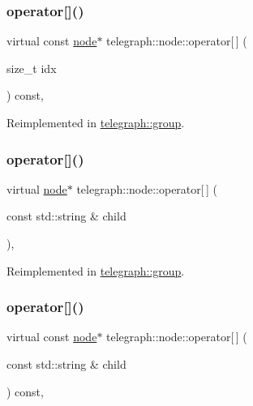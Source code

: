 \subsubsection{\texorpdfstring{operator[]()}{operator[]()}\hspace{0.1cm}{\footnotesize\ttfamily [2/4]}}
{\footnotesize\ttfamily virtual const \hyperlink{classtelegraph_1_1node}{node}$\ast$ telegraph\+::node\+::operator\mbox{[}$\,$\mbox{]} (\begin{DoxyParamCaption}\item[{size\+\_\+t}]{idx }\end{DoxyParamCaption}) const\hspace{0.3cm}{\ttfamily [inline]}, {\ttfamily [virtual]}}



Reimplemented in \hyperlink{classtelegraph_1_1group_a1b084997076f624d3814b057b26162cd}{telegraph\+::group}.

\mbox{\label{classtelegraph_1_1node_a3cf657c57fe639f6288f2acdd9b50e3c}} 
\subsubsection{\texorpdfstring{operator[]()}{operator[]()}\hspace{0.1cm}{\footnotesize\ttfamily [3/4]}}
{\footnotesize\ttfamily virtual \hyperlink{classtelegraph_1_1node}{node}$\ast$ telegraph\+::node\+::operator\mbox{[}$\,$\mbox{]} (\begin{DoxyParamCaption}\item[{const std\+::string \&}]{child }\end{DoxyParamCaption})\hspace{0.3cm}{\ttfamily [inline]}, {\ttfamily [virtual]}}



Reimplemented in \hyperlink{classtelegraph_1_1group_a84db0dc9c8d45bdd343a0d4da44a3593}{telegraph\+::group}.

\mbox{\label{classtelegraph_1_1node_aad6b0bbccc9831f82117a1cc03493f6c}} 
\subsubsection{\texorpdfstring{operator[]()}{operator[]()}\hspace{0.1cm}{\footnotesize\ttfamily [4/4]}}
{\footnotesize\ttfamily virtual const \hyperlink{classtelegraph_1_1node}{node}$\ast$ telegraph\+::node\+::operator\mbox{[}$\,$\mbox{]} (\begin{DoxyParamCaption}\item[{const std\+::string \&}]{child }\end{DoxyParamCaption}) const\hspace{0.3cm}{\ttfamily [inline]}, {\ttfamily [virtual]}}




